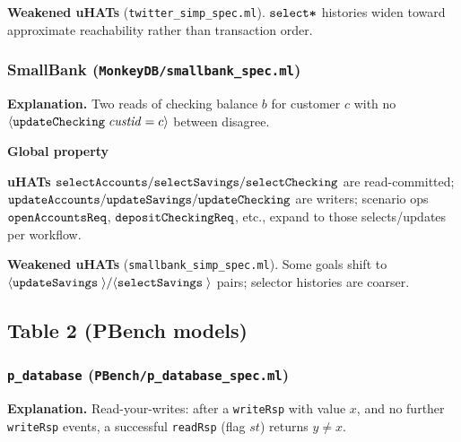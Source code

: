 \textbf{Weakened uHATs} (\texttt{twitter\_simp\_spec.ml}).
\(\boldsymbol{{\tt select*}}\) histories widen toward approximate reachability rather than transaction order.

\subsubsection*{SmallBank (\texttt{MonkeyDB/smallbank\_spec.ml})}
\textbf{Explanation.}
Two reads of checking balance \(b\) for customer \(c\) with no \({\langle} {\boldsymbol{{\tt updateChecking}}\;{\mathit{custid}=c}} {\rangle}\) between disagree.

\textbf{Global property}
\vspace{-.35cm}\par{}
\vspace{-.4cm}\par\nobreak\noindent
\textbf{uHATs}
\(\boldsymbol{{\tt selectAccounts}}/\boldsymbol{{\tt selectSavings}}/\boldsymbol{{\tt selectChecking}}\) are read-committed; \(\boldsymbol{{\tt updateAccounts}}/\boldsymbol{{\tt updateSavings}}/\boldsymbol{{\tt updateChecking}}\) are writers; scenario ops \(\boldsymbol{{\tt openAccountsReq}}\), \(\boldsymbol{{\tt depositCheckingReq}}\), etc., expand to those selects/updates per workflow.

\textbf{Weakened uHATs} (\texttt{smallbank\_simp\_spec.ml}).
Some goals shift to \({\langle} {\boldsymbol{{\tt updateSavings}}\;{}} {\rangle}/{\langle} {\boldsymbol{{\tt selectSavings}}\;{}} {\rangle}\) pairs; selector histories are coarser.

\subsection*{Table 2 (PBench models)}

\subsubsection*{\texttt{p\_database} (\texttt{PBench/p\_database\_spec.ml})}
\textbf{Explanation.}
Read-your-writes: after a \texttt{writeRsp} with value \(x\), and no further \texttt{writeRsp} events, a successful \texttt{readRsp} (flag \(\mathit{st}\)) returns \(y\neq x\).

